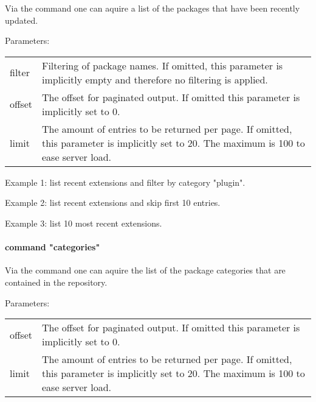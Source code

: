 Via the  command one can aquire a list of the packages that have been recently updated.

Parameters:\\
\begin{tabular}{lp{}}\\
filter & Filtering of package names. If omitted, this parameter is implicitly empty and therefore no filtering is applied.\\ 
offset & The offset for paginated output. If omitted this parameter is implicitly set to 0. \\ 
limit & The amount of entries to be returned per page. If omitted, this parameter is implicitly set to 20. The maximum is 100 to ease server load.
\end{tabular}

\vspace{.5cm}
Example 1: list recent extensions and filter by category "plugin".\\
\vspace{.5cm}

Example 2: list recent extensions and skip first 10 entries.\\
\vspace{.5cm}

Example 3: list 10 most recent extensions.\\
\vspace{.5cm}

\paragraph{command "categories"}

Via the  command one can aquire the list of the package categories that are contained in the repository.

Parameters:\\
\begin{tabular}{lp{}}\\
offset & The offset for paginated output. If omitted this parameter is implicitly set to 0. \\ 
limit & The amount of entries to be returned per page. If omitted, this parameter is implicitly set to 20. The maximum is 100 to ease server load.
\end{tabular}

